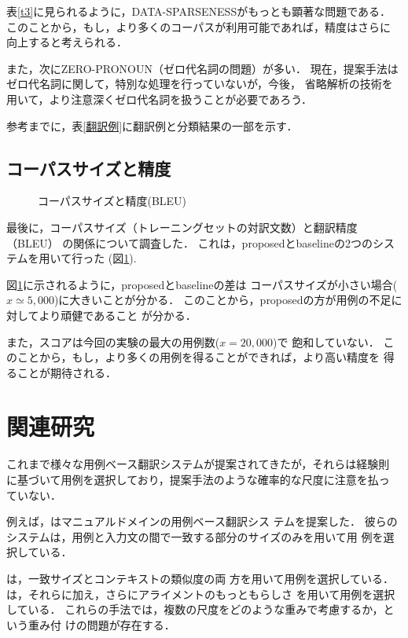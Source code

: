 表\ref{t3}に見られるように，DATA-SPARSENESSがもっとも顕著な問題である．
このことから，もし，より多くのコーパスが利用可能であれば，精度はさらに
向上すると考えられる．

また，次にZERO-PRONOUN（ゼロ代名詞の問題）が多い．
現在，提案手法はゼロ代名詞に関して，特別な処理を行っていないが，今後，
省略解析の技術を用いて，より注意深くゼロ代名詞を扱うことが必要であろう．

参考までに，表\ref{翻訳例}に翻訳例と分類結果の一部を示す．


\subsection{コーパスサイズと精度}

	
	
	
	\begin{figure}
	\begin{center}
	\epsfxsize=80mm
	\end{center}
	\caption{コーパスサイズと精度(BLEU)}
	\label{f_g1.eps}
	\end{figure}
	
	
	

最後に，コーパスサイズ（トレーニングセットの対訳文数）と翻訳精度（BLEU）
の関係について調査した．
これは，{\sc proposed}と{\sc baseline}の2つのシステムを用いて行った
(図\ref{f_g1.eps}).

図\ref{f_g1.eps}に示されるように，{\sc proposed}と{\sc baseline}の差は
コーパスサイズが小さい場合($x\simeq5,000$)に大きいことが分かる．
このことから，{\sc proposed}の方が用例の不足に対してより頑健であること
が分かる．

また，スコアは今回の実験の最大の用例数($x=20,000$)で
飽和していない．
このことから，もし，より多くの用例を得ることができれば，より高い精度を
得ることが期待される．

\section{関連研究}

これまで様々な用例ベース翻訳システムが提案されてきたが，それらは経験則
\pagebreak
に基づいて用例を選択しており，提案手法のような確率的な尺度に注意を払っ
ていない．

例えば，\cite{Richardson2001}はマニュアルドメインの用例ベース翻訳シス
テムを提案した．
彼らのシステムは，用例と入力文の間で一致する部分のサイズのみを用いて用
例を選択している．

\cite{Furuse1994,Imamura2002}は，一致サイズとコンテキストの類似度の両
方を用いて用例を選択している．
\cite{aramaki2003}は，それらに加え，さらにアライメントのもっともらしさ
を用いて用例を選択している．
これらの手法では，複数の尺度をどのような重みで考慮するか，という重み付
けの問題が存在する．


